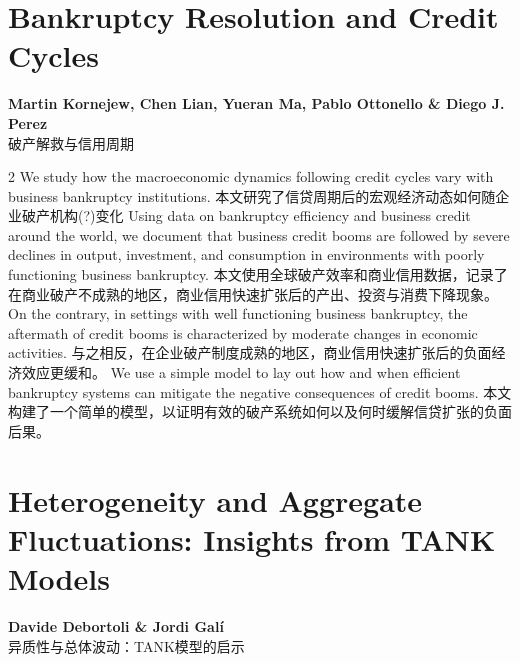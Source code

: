 \documentclass[cn,hazy,blue,14pt,screen]{elegantnote}
\begin{document}
\section{Bankruptcy Resolution and Credit Cycles}
\begin{center}
	\textbf{Martin Kornejew, Chen Lian, Yueran Ma, Pablo Ottonello \& Diego J. Perez}\\
	破产解救与信用周期
\end{center}

\begin{paracol}{2}
	We study how the macroeconomic dynamics following credit cycles vary with business bankruptcy institutions. 
	\switchcolumn
	本文研究了信贷周期后的宏观经济动态如何随企业破产机构(?)变化
	\switchcolumn*
	Using data on bankruptcy efficiency and business credit around the world, we document that business credit booms are followed by severe declines in output, investment, and consumption in environments with poorly functioning business bankruptcy. 
	\switchcolumn
	本文使用全球破产效率和商业信用数据，记录了在商业破产不成熟的地区，商业信用快速扩张后的产出、投资与消费下降现象。
	\switchcolumn*
	On the contrary, in settings with well functioning business bankruptcy, the aftermath of credit booms is characterized by moderate changes in economic activities. 
	\switchcolumn
	与之相反，在企业破产制度成熟的地区，商业信用快速扩张后的负面经济效应更缓和。
	\switchcolumn*
	We use a simple model to lay out how and when efficient bankruptcy systems can mitigate the negative consequences of credit booms.
	\switchcolumn
	本文构建了一个简单的模型，以证明有效的破产系统如何以及何时缓解信贷扩张的负面后果。
	
\end{paracol}

\section{Heterogeneity and Aggregate Fluctuations: Insights from TANK Models}
\begin{center}
	\textbf{Davide Debortoli \& Jordi Galí}\\
	异质性与总体波动：TANK模型的启示
\end{center}
\end{document}
